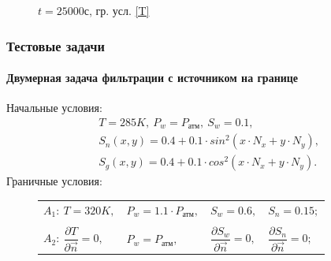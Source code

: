 \begin{frame}
\begin{center}
\begin{figure}
\begin{minipage}{0.49\textwidth}
\vspace{-2mm}
\caption{$t=25000$с, гр. усл. \ref{T}}
\end{minipage}
\end{figure}
\end{center}
\end{frame}


\begin{frame}
\frametitle{Тестовые задачи}
\framesubtitle{Двумерная задача фильтрации с источником на границе}
\begin{center}
Начальные условия: 
\begin{equation*}
  \begin{aligned}
    &T=285K,\ P_w=P_\text{атм},\ S_w=0.1,\\
    &S_n(x, y)=0.4 + 0.1 \cdot sin^2(x \cdot N_x + y \cdot N_y),\\
    &S_g(x, y)=0.4 + 0.1 \cdot cos^2(x \cdot N_x + y \cdot N_y).
   \end{aligned}
\end{equation*}
Граничные условия:
\begin{figure}
\begin{minipage}[h]{0.24\textwidth}
\end{minipage}
\hfill
\begin{minipage}[h]{0.75\textwidth}
  \begin{tabular}{ l l l l }
    $A_1:\ T=320K,$ & $P_w=1.1\cdot P_{\text{атм}},$ & $S_w=0.6,$ & $S_n=0.15;$\\
      & & & \\
    $A_2:\ \dfrac{\partial{T}}{\partial{\overrightarrow{n}}}=0,$ & ${P_w}=P_{\text{атм}},$ & $\dfrac{\partial{S_w}}{\partial{\overrightarrow{n}}}=0,$ & $\dfrac{\partial{S_n}}{\partial{\overrightarrow{n}}}=0;$\\

\end{tabular}
\end{minipage}
\end{figure}
\end{center}
\end{frame}
